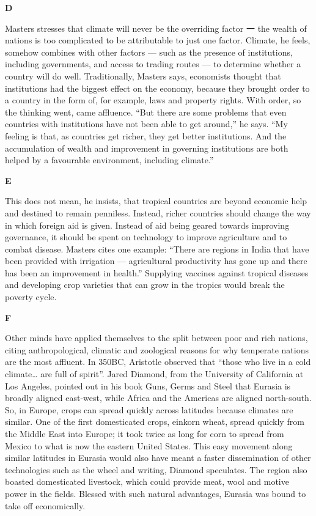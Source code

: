 \documentclass{../templateReading/cdreading}
\begin{document}
\textbf{D}\par

Masters stresses that climate will never be the overriding factor 一 the wealth of nations is too complicated to be attributable to just one factor. Climate, he feels, somehow combines with other factors — such as the presence of institutions, including governments, and access to trading routes — to determine whether a country will do well. Traditionally, Masters says, economists thought that institutions had the biggest effect on the economy, because they brought order to a country in the form of, for example, laws and property rights. With order, so the thinking went, came affluence. “But there are some problems that even countries with institutions have not been able to get around,” he says. “My feeling is that, as countries get richer, they get better institutions. And the accumulation of wealth and improvement in governing institutions are both helped by a favourable environment, including climate.”

\textbf{E}\par

This does not mean, he insists, that tropical countries are beyond economic help and destined to remain penniless. Instead, richer countries should change the way in which foreign aid is given. Instead of aid being geared towards improving governance, it should be spent on technology to improve agriculture and to combat disease. Masters cites one example: “There are regions in India that have been provided with irrigation — agricultural productivity has gone up and there has been an improvement in health.” Supplying vaccines against tropical diseases and developing crop varieties that can grow in the tropics would break the poverty cycle.

\textbf{F}\par

Other minds have applied themselves to the split between poor and rich nations, citing anthropological, climatic and zoological reasons for why temperate nations are the most affluent. In 350BC, Aristotle observed that “those who live in a cold climate… are full of spirit”. Jared Diamond, from the University of California at Los Angeles, pointed out in his book Guns, Germs and Steel that Eurasia is broadly aligned east-west, while Africa and the Americas are aligned north-south. So, in Europe, crops can spread quickly across latitudes because climates are similar. One of the first domesticated crops, einkorn wheat, spread quickly from the Middle East into Europe; it took twice as long for corn to spread from Mexico to what is now the eastern United States. This easy movement along similar latitudes in Eurasia would also have meant a faster dissemination of other technologies such as the wheel and writing, Diamond speculates. The region also boasted domesticated livestock, which could provide meat, wool and motive power in the fields. Blessed with such natural advantages, Eurasia was bound to take off economically.
\end{document}
